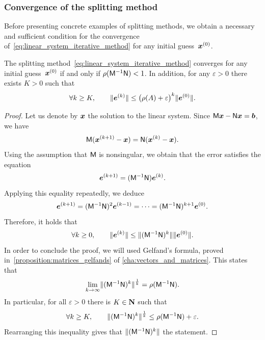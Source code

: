 \subsubsection{Convergence of the splitting method}%
\label{ssub:convergence_of_the_basic_splitting_method}
Before presenting concrete examples of splitting methods,
we obtain a necessary and sufficient condition for the convergence of~\eqref{eq:linear_system_iterative_method}
for any initial guess~$\mathbf{\boldsymbol{x}}^{(0)}$.

\begin{proposition}
    [Convergence]
    \label{proposition:linear_convergence}
    The splitting method~\eqref{eq:linear_system_iterative_method} converges for any initial guess~$\mathbf{\boldsymbol{x}}^{(0)}$
    if and only if $\rho(\mathsf M^{-1} \mathsf N) < 1$.
    In addition, for any $\varepsilon > 0$ there exists $K > 0$ such that
    \[
        \forall k \geq K,
        \qquad
        \lVert\mathbf{\boldsymbol{e}}^{(k)}\rVert \leq \bigl(\rho(A) + \varepsilon\bigr)^k \lVert\mathbf{\boldsymbol{e}}^{(0)}\rVert.
    \]
\end{proposition}
\begin{proof}
    Let us denote by $\mathbf{\boldsymbol{x}}$ the solution to the linear system.
    Since $\mathsf M \mathbf{\boldsymbol{x}} - \mathsf N \mathbf{\boldsymbol{x}} = \mathbf{\boldsymbol{b}}$,
    we have
    \[
        \mathsf M (\mathbf{\boldsymbol{x}}^{(k+1)} - \mathbf{\boldsymbol{x}}) = \mathsf N (\mathbf{\boldsymbol{x}}^{(k)} - \mathbf{\boldsymbol{x}}).
    \]
    Using the assumption that $\mathsf M$ is nonsingular,
    we obtain that the error satisfies the equation
    \[
        \mathbf{\boldsymbol{e}}^{(k+1)} = (\mathsf M^{-1} \mathsf N) \mathbf{\boldsymbol{e}}^{(k)}.
    \]
    Applying this equality repeatedly, we deduce
    \[
        \mathbf{\boldsymbol{e}}^{(k+1)} = (\mathsf M^{-1} \mathsf N)^2 \mathbf{\boldsymbol{e}}^{(k-1)} = \dots = (\mathsf M^{-1} \mathsf N)^{k+1} \mathbf{\boldsymbol{e}}^{(0)}.
    \]
    Therefore,
    it holds that
    \[
        \forall k \geq 0, \qquad
        \norm{\vect e^{(k)}}
        \leq \norm[bigl]{(\mat M^{-1} \mat N)^{k}} \norm{\vect e^{(0)}}.
    \]
    In order to conclude the proof,
    we will used Gelfand's formula,
    proved in~\cref{proposition:matrices_gelfands} of \cref{cha:vectors_and_matrices}.
    This states that
    \[
        \lim_{k \to \infty} \norm[bigl]{(\mat M^{-1} \mat N)^{k}}^{\frac{1}{k}} = \rho(\mat M^{-1} \mat N).
    \]
    In particular, for all $\varepsilon > 0$ there is $K \in \mathbf N$ such that
    \[
        \forall k \geq K, \qquad
        \norm[bigl]{(\mat M^{-1} \mat N)^{k}}^{\frac{1}{k}} \leq \rho(\mat M^{-1} \mat N) + \varepsilon.
    \]
    Rearranging this inequality gives that $\norm[bigl]{(\mat M^{-1} \mat N)^{k}} $ the statement.
\end{proof}

